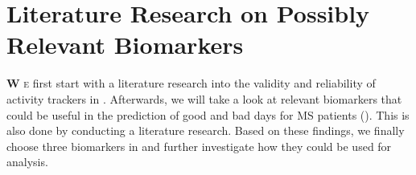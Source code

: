 
\chapter{Literature Research on Possibly Relevant Biomarkers}\label{chapter: Literature Research}
\lettrine[lhang = 0.4, findent=-60pt, lines=7]{\textbf{
		\initfamily \fontsize{40mm}{40mm} \selectfont W
		\normalfont}}{e}
first start with a literature research into the validity and reliability of activity trackers in .
Afterwards, we will take a look at relevant biomarkers that could be useful in the prediction of good and bad days for MS patients ().
This is also done by conducting a literature research.
Based on these findings, we finally choose three biomarkers in  and further investigate how they could be used for analysis.



